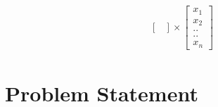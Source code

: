\documentclass[12pt]{beamer}
\begin{document}
\begin{frame}
\begin{center}
\begin{itemize}
\begin{equation*}
\begin{matrix}
\begin{bmatrix}
	\end{bmatrix}
	  \times
	  \begin{bmatrix}
	 	x_1\\ x_2\\ ..\\ ..\\ x_n
	 	\end{bmatrix}
\end{matrix}
\end{equation*}
\end{itemize}
\end{center}
\end{frame}

	
\section{Problem Statement}
\end{document}
